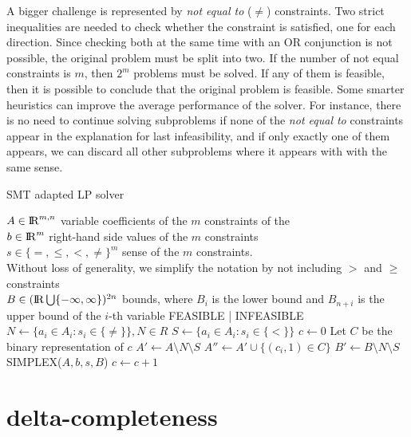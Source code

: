 \documentclass[runningheads]{llncs}
\begin{document}
A bigger challenge is represented by \textit{not equal to} ($\ne$) constraints.
Two strict inequalities are needed to check whether the constraint is satisfied, one for each direction.
Since checking both at the same time with an OR conjunction is not possible, the original problem must be split into two.
If the number of not equal constraints is $m$, then $2^m$ problems must be solved.
If any of them is feasible, then it is possible to conclude that the original problem is feasible.
Some smarter heuristics can improve the average performance of the solver.
For instance, there is no need to continue solving subproblems if none of the \textit{not equal to} constraints appear in the explanation for last infeasibility, and if only exactly one of them appears, we can discard all other subproblems where it appears with with the same sense.
\begin{algorithm}
    \caption{SMT adapted LP solver}\label{alg:cap}
    \begin{algorithmic}
        \Require $A \in {\rm I\!R}^{m, n}$ variable coefficients of the $m$ constraints of the   \\
        $b \in {\rm I\!R}^m$ right-hand side values of the $m$ constraints \\
        $s \in \{=, \le, <, \ne\}^m$  sense of the $m$ constraints. \\
        \qquad Without loss of generality, we simplify the notation by not including $>$ and $\ge$ constraints \\
        $B \in ({\rm I\!R} \bigcup \{-\infty, \infty\})^{2n}$ bounds, where $B_i$ is the lower bound and $B_{n+i}$ is the upper bound of the $i$-th variable
        \Ensure FEASIBLE | INFEASIBLE
        \State $N \gets \{a_i \in A_i : s_i \in \{\ne\}\}, N \in R$ 
        \State $S \gets \{a_i \in A_i : s_i \in \{<\}\}$ 
        \State $c \gets 0$
        \State Let $C$ be the binary representation of $c$
        \State $A' \gets A \setminus N \setminus S$
        \State $A'' \gets A' \cup \{(c_i, 1) \in C\}$
        \State $B' \gets B \setminus N \setminus S$
        \State SIMPLEX($A, b, s, B$) 
        \State $c \gets c + 1$
        \EndWhile
    \end{algorithmic}
\end{algorithm}

\section{delta-completeness}
\end{document}
